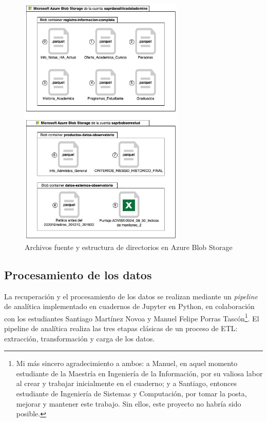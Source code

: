 \begin{figure}[h]
    \centering
    \includegraphics[width=0.7\textwidth]{img/blob_storage.jpg}
    \caption{Archivos fuente y estructura de directorios en Azure Blob Storage}
    \label{fig:blob_storage}
\end{figure}

\subsection{Procesamiento de los datos}

La recuperación y el procesamiento de los datos se realizan mediante un \textit{pipeline} de analítica implementado en cuadernos de Jupyter en Python, en colaboración con los estudiantes Santiago Martínez Novoa y Manuel Felipe Porras Tascón\footnote{Mi más sincero agradecimiento a ambos: a Manuel, en aquel momento estudiante de la Maestría en Ingeniería de la Información, por su valiosa labor al crear y trabajar inicialmente en el cuaderno; y a Santiago, entonces estudiante de Ingeniería de Sistemas y Computación, por tomar la posta, mejorar y mantener este trabajo. Sin ellos, este proyecto no habría sido posible.}.
El pipeline de analítica realiza las tres etapas clásicas de un proceso de \gls{ETL}: extracción, transformación y carga de los datos.


